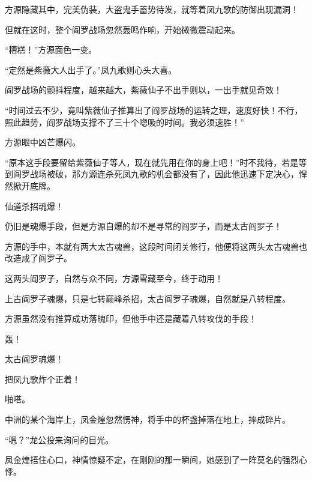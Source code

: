 \begin{this_body}
方源隐藏其中，完美伪装，大盗鬼手蓄势待发，就等着凤九歌的防御出现漏洞！

但就在这时，整个阎罗战场忽然轰鸣作响，开始微微震动起来。

“糟糕！”方源面色一变。

“定然是紫薇大人出手了。”凤九歌则心头大喜。

阎罗战场的颤抖程度，越来越大，紫薇仙子不出手则以，一出手就见奇效！

“时间过去不少，竟叫紫薇仙子推算出了阎罗战场的运转之理，速度好快！不行，照此趋势，阎罗战场支撑不了三十个唿吸的时间。我必须速胜！”

方源眼中凶芒爆闪。

“原本这手段要留给紫薇仙子等人，现在就先用在你的身上吧！”时不我待，若是等到阎罗战场被破，那方源连杀死凤九歌的机会都没有了，因此他迅速下定决心，悍然掀开底牌。

仙道杀招魂爆！

仍旧是魂爆手段，但是方源自爆的却不是寻常的阎罗子，而是太古阎罗子！

方源的手中，本就有两大太古魂兽，这段时间闭关修行，他便将这两头太古魂兽也改造成了阎罗子。

这两头阎罗子，自然与众不同，方源雪藏至今，终于动用！

上古阎罗子魂爆，只是七转巅峰杀招，太古阎罗子魂爆，自然就是八转程度。

方源虽然没有推算成功落魄印，但他手中还是藏着八转攻伐的手段！

轰！

太古阎罗魂爆！

把凤九歌炸个正着！

啪嗒。

中洲的某个海岸上，凤金煌忽然愣神，将手中的杯盏掉落在地上，摔成碎片。

“嗯？”龙公投来询问的目光。

凤金煌捂住心口，神情惊疑不定，在刚刚的那一瞬间，她感到了一阵莫名的强烈心悸。

\end{this_body}

